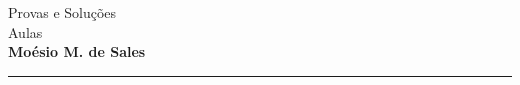 \documentclass[11pt,a4paper]{article}
\newcommand{\nome}{\bf Moésio M. de Sales}
\newcommand{\titu}{Provas e Soluções}
\newcommand{\disc}{Aulas}
\begin{document}
{\Large
\begin{center} \titu\\ \disc\\  \nome\end{center}
}
\hfill   %
\hrule\ 






\listoftodos[Notes]

\printbibliography
\end{document}
